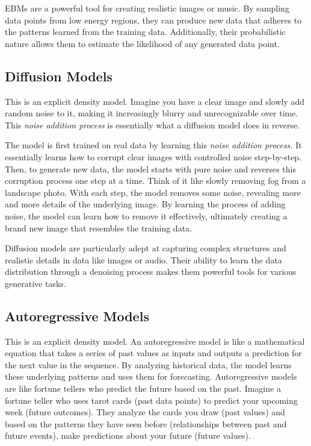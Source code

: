 \documentclass[10pt, letterpaper, twoside]{article}
\begin{document}
EBMs are a powerful tool for creating realistic images or music. By sampling data points from low energy regions, they can produce new data that adheres to the patterns learned from the training data. Additionally, their probabilistic nature allows them to estimate the likelihood of any generated data point.

\subsection{Diffusion Models}\label{sec:diffusion_models}

This is an explicit density model. Imagine you have a clear image and slowly add random noise to it, making it increasingly blurry and unrecognizable over time. This \textit{noise addition process} is essentially what a diffusion model does in reverse.

The model is first trained on real data by learning this \textit{noise addition process.} It essentially learns how to corrupt clear images with controlled noise step-by-step. Then, to generate new data, the model starts with pure noise and reverses this corruption process one step at a time. Think of it like slowly removing fog from a landscape photo. With each step, the model removes some noise, revealing more and more details of the underlying image. By learning the process of adding noise, the model can learn how to remove it effectively, ultimately creating a brand new image that resembles the training data.

Diffusion models are particularly adept at capturing complex structures and realistic details in data like images or audio. Their ability to learn the data distribution through a denoising process makes them powerful tools for various generative tasks.

\subsection{Autoregressive Models}\label{sec:autoregressive_models}

This is an explicit density model. An autoregressive model is like a mathematical equation that takes a series of past values as inputs and outputs a prediction for the next value in the sequence. By analyzing historical data, the model learns these underlying patterns and uses them for forecasting. Autoregressive models are like fortune tellers who predict the future based on the past. Imagine a fortune teller who uses tarot cards (past data points) to predict your upcoming week (future outcomes). They analyze the cards you draw (past values) and based on the patterns they have seen before (relationships between past and future events), make predictions about your future (future values).
\end{document}
